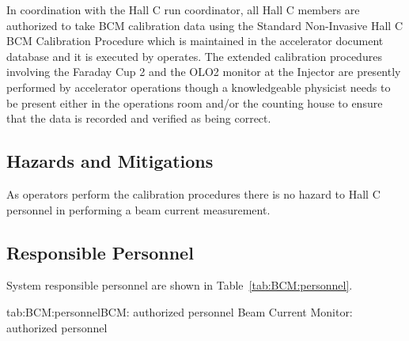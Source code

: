 \begin{safetyen}{10}{10}

In coordination with the Hall C run coordinator, all Hall C members
are authorized to take BCM calibration data using the Standard
Non-Invasive Hall C BCM Calibration Procedure which is maintained in
the accelerator document database and it is executed by operates. The
extended calibration procedures involving the Faraday Cup 2 and the
OLO2 monitor at the Injector are presently performed by accelerator
operations though a knowledgeable physicist needs to be present either
in the operations room and/or the counting house to ensure that the
data is recorded and verified as being correct.


\subsection{Hazards and Mitigations}

As operators perform the calibration procedures there is no hazard to
Hall C personnel in performing a beam current measurement.

\subsection{Responsible Personnel}
System responsible personnel are shown in Table~\ref{tab:BCM:personnel}.
\begin{namestab}{tab:BCM:personnel}{BCM: authorized personnel}{%
   Beam Current Monitor: authorized personnel}
\end{namestab}
\end{safetyen}

